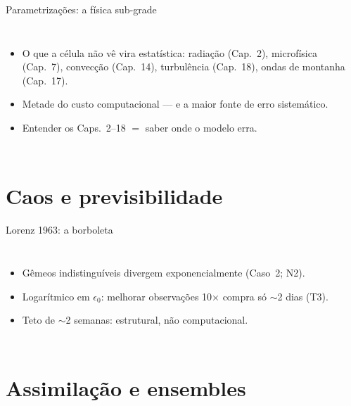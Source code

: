 \documentclass[aspectratio=169,11pt]{beamer}
\begin{document}
\begin{frame}{Parametrizações: a física sub-grade}
  \begin{columns}
    \begin{itemize}
      \item O que a célula não vê vira estatística: radiação
            (Cap.~2), microfísica (Cap.~7), convecção (Cap.~14),
            turbulência (Cap.~18), ondas de montanha (Cap.~17).
      \item Metade do custo computacional — e a maior fonte de erro
            sistemático.
      \item Entender os Caps.~2--18 $=$ saber onde o modelo erra.
    \end{itemize}
  \end{columns}
\end{frame}

\section{Caos e previsibilidade}

\begin{frame}{Lorenz 1963: a borboleta}
  \begin{columns}
    \vspace{0.4em}
    \begin{itemize}
      \item Gêmeos indistinguíveis divergem exponencialmente
            (Caso~2; N2).
      \item Logarítmico em $\epsilon_0$: melhorar observações 10×
            compra só $\sim$2 dias (T3).
      \item Teto de $\sim$2 semanas: estrutural, não computacional.
    \end{itemize}
  \end{columns}
\end{frame}

\section{Assimilação e ensembles}
\end{document}
